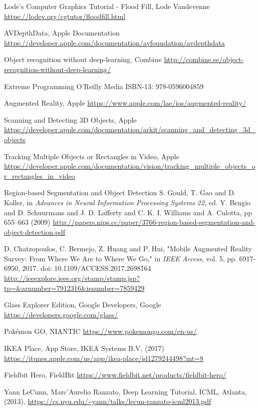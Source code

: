 \begin{thebibliography}{X}
Lode's Computer Graphics Tutorial - Flood Fill, Lode Vandevenne
\url{https://lodev.org/cgtutor/floodfill.html}

AVDepthData, Apple Documentation
\url{https://developer.apple.com/documentation/avfoundation/avdepthdata}

Object recognition without deep-learning, Combine
\url{http://combine.se/object-recognition-without-deep-learning/}

Extreme Programming
O'Reilly Media
ISBN-13: 978-0596004859

Augmented Reality, Apple
\url{https://www.apple.com/lae/ios/augmented-reality/}

Scanning and Detecting 3D Objects, Apple
\url{https://developer.apple.com/documentation/arkit/scanning_and_detecting_3d_objects}

Tracking Multiple Objects or Rectangles in Video, Apple
\url{https://developer.apple.com/documentation/vision/tracking_multiple_objects_or_rectangles_in_video}

Region-based Segmentation and Object Detection
S. Gould, T. Gao and D. Koller, in \textit{Advances in Neural Information Processing Systems 22}, 
ed. Y. Bengio and D. Schuurmans and J. D. Lafferty 
and C. K. I. Williams and A. Culotta, 
pp 655--663
(2009)
\url{http://papers.nips.cc/paper/3766-region-based-segmentation-and-object-detection.pdf}

D. Chatzopoulos, C. Bermejo, Z. Huang and P. Hui, "Mobile Augmented Reality Survey: From Where We Are to Where We Go," in \textit{IEEE Access}, vol. 5, pp. 6917-6950, 2017.
doi: 10.1109/ACCESS.2017.2698164
\url{http://ieeexplore.ieee.org/stamp/stamp.jsp?tp=&arnumber=7912316&isnumber=7859429}

Glass Explorer Edition, Google Developers, Google
\url{https://developers.google.com/glass/}

Pokémon GO, NIANTIC
\url{https://www.pokemongo.com/en-us/}


IKEA Place, App Store, IKEA Systems B.V, (2017)
\url{https://itunes.apple.com/us/app/ikea-place/id1279244498?mt=8}

Fieldbit Hero, FieldBit
\url{https://www.fieldbit.net/products/fieldbit-hero/}

Yann LeCunn, Marc'Aurelio Ranzato, Deep Learning Tutorial, ICML, Atlanta, (2013), 
\url{https://cs.nyu.edu/~yann/talks/lecun-ranzato-icml2013.pdf}


\end{thebibliography}
